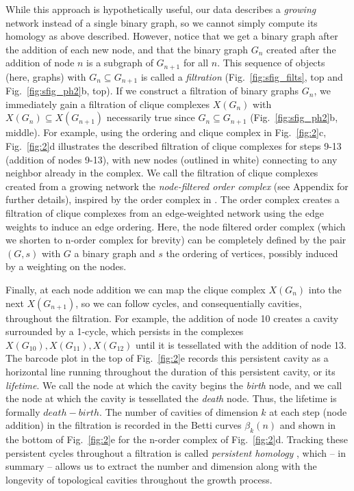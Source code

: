 \documentclass{article}
\begin{document}
While this approach is hypothetically useful, our data describes a \emph{growing} network instead of a single binary graph, so we cannot simply compute its homology as above described. However, notice that we get a binary graph after the addition of each new node, and that the binary graph $G_n$ created after the addition of node $n$ is a subgraph of $G_{n+1}$ for all $n$. This sequence of objects (here, graphs) with $G_n \subseteq G_{n+1}$ is called a \emph{filtration} (Fig.~\ref{fig:sfig_filts}, top and Fig.~\ref{fig:sfig_ph2}b, top). If we construct a filtration of binary graphs $G_n$, we immediately gain a filtration of clique complexes $X(G_n)$ with $X(G_n)\subseteq X(G_{n+1})$ necessarily true since $G_n \subseteq G_{n+1}$ (Fig.~\ref{fig:sfig_ph2}b, middle). For example, using the ordering and clique complex in Fig.~\ref{fig:2}c, Fig.~\ref{fig:2}d illustrates the described filtration of clique complexes for steps 9-13 (addition of nodes 9-13), with new nodes (outlined in white) connecting to any neighbor already in the complex. We call the filtration of clique complexes created from a growing network the \emph{node-filtered order complex} (see Appendix for further details), inspired by the order complex in \cite{giusti2015clique}. The order complex creates a filtration of clique complexes from an edge-weighted network using the edge weights to induce an edge ordering. Here, the node filtered order complex (which we shorten to n-order complex for brevity) can be completely defined by the pair $(G,s)$ with $G$ a binary graph and $s$ the ordering of vertices, possibly induced by a weighting on the nodes.

Finally, at each node addition we can map the clique complex $X(G_n)$ into the next $X(G_{n+1})$, so we can follow cycles, and consequentially cavities, throughout the filtration. For example, the addition of node 10 creates a cavity surrounded by a 1-cycle, which persists in the complexes $X(G_{10}), X(G_{11}), X(G_{12})$ until it is tessellated with the addition of node 13. The barcode plot in the top of Fig.~\ref{fig:2}e records this persistent cavity as a horizontal line running throughout the duration of this persistent cavity, or its \emph{lifetime}. We call the node at which the cavity begins the \emph{birth} node, and we call the node at which the cavity is tessellated the \emph{death} node. Thus, the lifetime is formally $death-birth$. The number of cavities of dimension $k$ at each step (node addition) in the filtration is recorded in the Betti curves $\beta_k(n)$ and shown in the bottom of Fig.~\ref{fig:2}e for the n-order complex of Fig.~\ref{fig:2}d. Tracking these persistent cycles throughout a filtration is called \emph{persistent homology} \cite{carlsson2009topology,zomorodian2005computing}, which -- in summary -- allows us to extract the number and dimension along with the longevity of topological cavities throughout the growth process.
\end{document}
